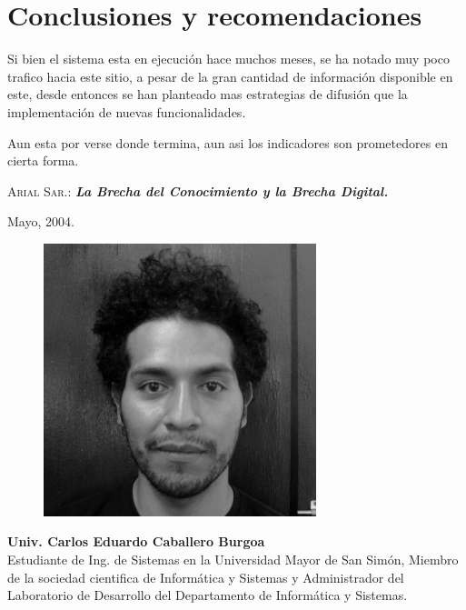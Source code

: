 \documentclass[letter,11pt,oneside,spanish]{article}
\begin{document}
\section{Conclusiones y recomendaciones}
Si bien el sistema esta en ejecución hace muchos meses, se ha notado muy poco trafico hacia este
sitio, a pesar de la gran cantidad de información disponible en este, desde entonces se han
planteado mas estrategias de difusión que la implementación de nuevas funcionalidades.

Aun esta por verse donde termina, aun asi los indicadores son prometedores en cierta forma.

\newpage
\begin{thebibliography}{99}
        \textsc{Arial Sar.:}
        \textit{\textbf{La Brecha del Conocimiento y la Brecha Digital.}}
        \par Mayo, 2004.
\end{thebibliography}

\newpage
\begin{figure}
 \includegraphics[scale=0.3]{jacobian.jpg}
\end{figure}
\textbf{Univ. Carlos Eduardo Caballero Burgoa}\\
Estudiante de Ing. de Sistemas en la Universidad Mayor de San Simón, Miembro de la sociedad cientifica
de Informática y Sistemas y Administrador del Laboratorio de Desarrollo del Departamento de
Informática y Sistemas. 
\end{document}
